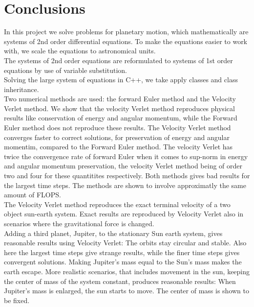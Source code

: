 \documentclass{article}
\begin{document}
\section{Conclusions}
In this project we solve problems for planetary motion, which mathematically are systems of 2nd order differential equations. To make the equations easier to work with, we scale the equations to astronomical units.\\

The systems of 2nd order equations are reformulated to systems of 1st order equations by use of variable substitution. \\

Solving the large system of equations in C++, we take apply classes and class inheritance.\\

Two numerical methods are used: the forward Euler method and the Velocity Verlet method. We show that the velocity Verlet method reproduces physical results like conservation of energy and angular momentum, while the Forward Euler method does not reproduce these results. The Velocity Verlet method converges faster to correct solutions, for preservation of energy and angular momentim, compared to the Forward Euler method. The velocity Verlet has twice the convergence rate of forward Euler when it comes to sup-norm in energy and angular momentum preservation, the velocity Verlet method being of order two and four for these quantitites respectively. Both methods gives bad results for the largest time steps. The methods are shown to involve approximatly the same amount of FLOPS.\\

The Velocity Verlet method reproduces the exact terminal velocity of a two object sun-earth system. Exact results are reproduced by Velocity Verlet also in scenarios where the gravitational force is changed. \\

Adding a third planet, Jupiter, to the stationary Sun earth system, gives reasonable results using Velocity Verlet: The orbits stay circular and stable. Also here the largest time steps give strange results, while the finer time steps gives convergent solutions. Making Jupiter's mass equal to the Sun's mass makes the earth escape. More realistic scenarios, that includes movement in the sun, keeping the center of mass of the system constant, produces reasonable results: When Jupiter's mass is enlarged, the sun starts to move. The center of mass is shown to be fixed.\\
\end{document}
